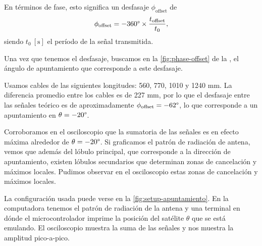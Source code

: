\documentclass{article}
\newenvironment{standalone}{\begin{preview}}{\end{preview}}
\begin{document}
\begin{standalone}
  En términos de fase, esto significa un desfasaje $\phi_{\text{offset}}$ de
  \begin{equation}
    \phi_{\text{offset}} = - 360\degree \times \frac{t_{\text{offset}}}{t_0},
    \tagaddtext{[\si{\degree}]}
  \end{equation}
  siendo $t_0 \ [\si{\second}]$ el período de la señal transmitida.

  Una vez que tenemos el desfasaje, buscamos en la \cref{fig:phase-offset} de la , el ángulo de apuntamiento que corresponde a este desfasaje.

  Usamos cables de las siguientes longitudes: 560, 770, 1010 y 1240 mm.
  La diferencia promedio entre los cables es de 227 mm, por lo que el desfasaje entre las señales teórico es de aproximadamente $\phi_{\text{offset}} = - 62\degree$, lo que corresponde a un apuntamiento en $\theta = -20\degree$.

  Corroboramos en el osciloscopio que la sumatoria de las señales es en efecto máxima alrededor de $\theta = -20\degree$.
  Si graficamos el patrón de radiación de antena, vemos que además del lóbulo principal, que corresponde a la dirección de apuntamiento, existen lóbulos secundarios que determinan zonas de cancelación y máximos locales.
  Pudimos observar en el osciloscopio estas zonas de cancelación y máximos locales.

  La configuración usada puede verse en la \cref{fig:setup-apuntamiento}.
  En la computadora tenemos el patrón de radiación de la antena y una terminal en dónde el microcontrolador imprime la posición del satélite $\theta$ que se está emulando.
  El osciloscopio muestra la suma de las señales y nos muestra la amplitud pico-a-pico.

  \begin{figure}[!htbp]
    \centering


\end{figure}
\end{standalone}
\end{document}
